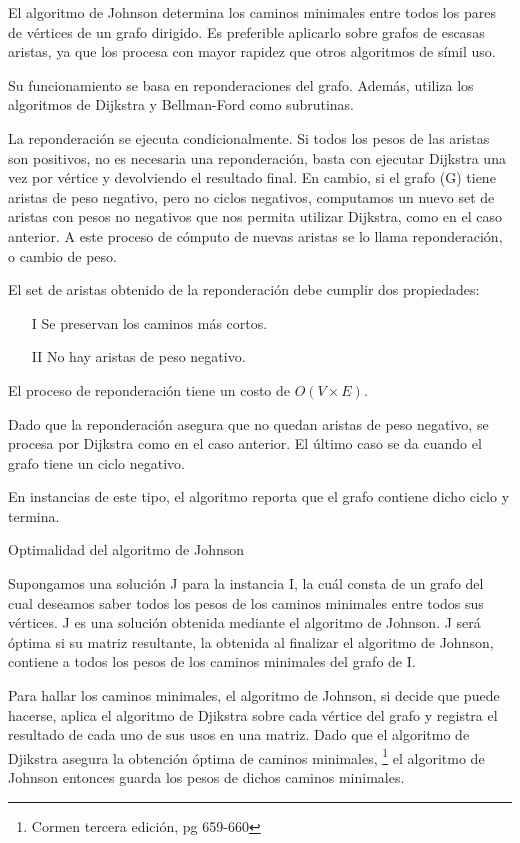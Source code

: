 \documentclass[../tp2_grupo404.tex]{subfiles}
\begin{document}
El algoritmo de Johnson determina los caminos minimales entre todos
los pares de vértices de un grafo dirigido. Es preferible aplicarlo
sobre grafos de escasas aristas, ya que los procesa con mayor
rapidez que otros algoritmos de símil uso.

Su funcionamiento se basa en reponderaciones del grafo. Además,
utiliza los algoritmos de Dijkstra y Bellman-Ford como subrutinas.

La reponderación se ejecuta condicionalmente. Si todos los pesos
de las aristas son positivos, no es necesaria una reponderación,
basta con ejecutar Dijkstra una vez por vértice y devolviendo el
resultado final. En cambio, si el grafo (G) tiene aristas de peso
negativo, pero no ciclos negativos, computamos un nuevo set de
aristas con pesos no negativos que nos permita utilizar Dijkstra,
como en el caso anterior. A este proceso de cómputo de nuevas
aristas se lo llama reponderación, o cambio de peso.

El set de aristas obtenido de la reponderación debe cumplir dos
propiedades:
\begin{enumerate}
    \item[I] Se preservan los caminos más cortos.
    \item[II] No hay aristas de peso negativo.
\end{enumerate}

El proceso de reponderación tiene un costo de $O(V\times E)$.

Dado que la reponderación asegura que no quedan aristas de peso
negativo, se procesa por Dijkstra como en el caso anterior.
El último caso se da cuando el grafo tiene un ciclo negativo.

En instancias de este tipo, el algoritmo reporta que el grafo
contiene dicho ciclo y termina.

Optimalidad del algoritmo de Johnson

Supongamos una solución J para la instancia I, la cuál consta de un grafo del cual deseamos saber todos los
pesos de los caminos minimales entre todos sus vértices. J es una solución obtenida mediante el algoritmo de
Johnson. J será óptima si su matriz resultante, la obtenida al finalizar el algoritmo de Johnson, contiene a
todos los pesos de los caminos minimales del grafo de I.

Para hallar los caminos minimales, el algoritmo de Johnson, si decide que puede hacerse, aplica el algoritmo
de Djikstra sobre cada vértice del grafo y registra el resultado de cada uno de sus usos en una matriz. Dado
que el algoritmo de Djikstra asegura la obtención óptima de caminos minimales,
\footnote{Cormen tercera edición, pg 659-660}
el algoritmo de Johnson entonces guarda los pesos de dichos caminos minimales.
\end{document}
